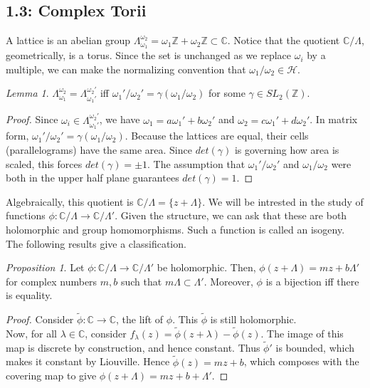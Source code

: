 \documentclass[11pt]{article}
\theoremstyle{definition}
\theoremstyle{example}
\theoremstyle{remark}
\theoremstyle{lemma}
\newtheorem{lemma}{Lemma}[section]
\theoremstyle{proposition}
\newtheorem{proposition}{Proposition}[section]
\theoremstyle{Problem}
\theoremstyle{Solution}
\theoremstyle{theorem}
\theoremstyle{corollary}
\begin{document}
\subsection{1.3: Complex Torii}
A lattice is an abelian group $\Lambda_{\omega_1}^{\omega_2} = \omega_1 \mathbb{Z} + \omega_2 \mathbb{Z} \subset \mathbb{C}$. Notice that the quotient $\mathbb{C}/\Lambda$, geometrically, is a torus. Since the set is unchanged as we replace $\omega_i$ by a multiple, we can make the normalizing convention that $\omega_1/\omega_2 \in \mathcal{H}$.\\
\begin{lemma}
$\Lambda_{\omega_1}^{\omega_2} = \Lambda_{\omega_1'}^{\omega_2'}$ iff $\omega_1'/ \omega_2' = \gamma(\omega_1/\omega_2)$ for some $\gamma\in SL_2(\mathbb{Z})$.
\end{lemma}
\begin{proof}
Since $\omega_i \in \Lambda_{\omega_1'}^{\omega_2'}$, we have $\omega_1 = a\omega_1'+b\omega_2'$ and $\omega_2 = c\omega_1'+d\omega_2'$. In matrix form, $\omega_1'/ \omega_2' = \gamma(\omega_1/\omega_2)$. Because the lattices are equal, their cells (parallelograms) have the same area. Since $det(\gamma)$ is governing how area is scaled, this forces $det(\gamma)=\pm1$. The assumption that $\omega_1'/ \omega_2'$ and $\omega_1/\omega_2$ were both in the upper half plane guarantees $det(\gamma)=1$.
\end{proof}
Algebraically, this quotient is $\mathbb{C}/\Lambda = \{ z + \Lambda\}$. We will be intrested in the study of functions $\phi : \mathbb{C}/\Lambda \to \mathbb{C}/\Lambda'$. Given the structure, we can ask that these are both holomorphic and group homomorphisms. Such a function is called an isogeny. The following results give a classification.
\begin{proposition}
Let $\phi : \mathbb{C}/\Lambda \to \mathbb{C}/\Lambda'$ be holomorphic. Then, $\phi(z+\Lambda) = mz + b \Lambda'$ for complex numbers $m, b$ such that $m\Lambda \subset \Lambda'$. Moreover, $\phi$ is a bijection iff there is equality.
\end{proposition}
\begin{proof}
Consider $\widetilde{\phi}:\mathbb{C} \to \mathbb{C}$, the lift of $\phi$. This $\widetilde{\phi}$ is still holomorphic.\\
Now, for all $\lambda\in\mathbb{C}$, consider $f_\lambda(z) = \widetilde{\phi}(z+\lambda) - \widetilde{\phi}(z)$. The image of this map is discrete by construction, and hence constant. Thus $\widetilde{\phi}'$ is bounded, which makes it constant by Liouville. Hence $\widetilde{\phi}(z) = mz + b$, which composes with the covering map to give $\phi(z + \Lambda) = mz + b + \Lambda'$.
\end{proof}
\end{document}
